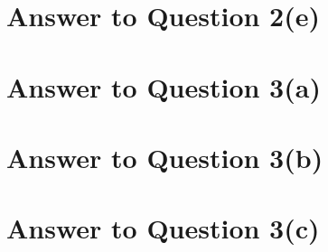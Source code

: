 \documentclass[11pt]{article}
\begin{document}
\pagebreak[4]
\section*{Answer to Question 2(e)}

\pagebreak[4]
\section*{Answer to Question 3(a)}

\pagebreak[4]
\section*{Answer to Question 3(b)}

\pagebreak[4]
\section*{Answer to Question 3(c)}
\end{document}

